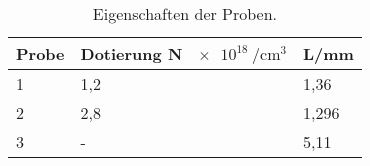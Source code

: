 \begin{table}[H]
  \centering
  \caption{Eigenschaften der Proben.}
  \label{tab:tabe6}
    \begin{tabular}{l l l}
    \toprule
    Probe & Dotierung N $\SI{e18}{\per\cubic\cm}$ & L/mm\\
    \midrule
    1 & 1,2 & 1,36\\
    2 & 2,8 & 1,296\\
    3& - & 5,11\\


          \bottomrule
        \end{tabular}
    \end{table}

